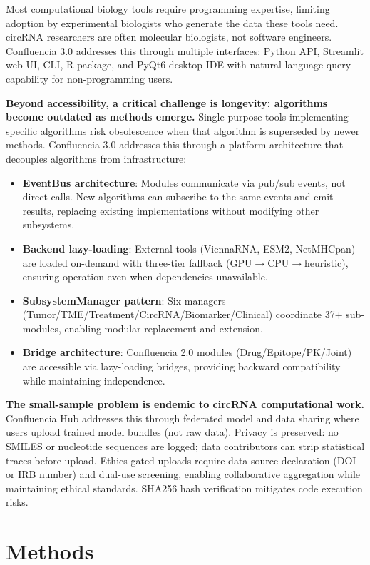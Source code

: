 \documentclass[12pt]{article}
\begin{document}
Most computational biology tools require programming expertise, limiting adoption by experimental biologists who generate the data these tools need. circRNA researchers are often molecular biologists, not software engineers. Confluencia 3.0 addresses this through multiple interfaces: Python API, Streamlit web UI, CLI, R package, and PyQt6 desktop IDE with natural-language query capability for non-programming users.

\textbf{Beyond accessibility, a critical challenge is longevity: algorithms become outdated as methods emerge.} Single-purpose tools implementing specific algorithms risk obsolescence when that algorithm is superseded by newer methods. Confluencia 3.0 addresses this through a platform architecture that decouples algorithms from infrastructure:

\begin{itemize}
\item \textbf{EventBus architecture}: Modules communicate via pub/sub events, not direct calls. New algorithms can subscribe to the same events and emit results, replacing existing implementations without modifying other subsystems.
\item \textbf{Backend lazy-loading}: External tools (ViennaRNA, ESM2, NetMHCpan) are loaded on-demand with three-tier fallback (GPU$\rightarrow$CPU$\rightarrow$heuristic), ensuring operation even when dependencies unavailable.
\item \textbf{SubsystemManager pattern}: Six managers (Tumor/TME/Treatment/CircRNA/Biomarker/Clinical) coordinate 37+ sub-modules, enabling modular replacement and extension.
\item \textbf{Bridge architecture}: Confluencia 2.0 modules (Drug/Epitope/PK/Joint) are accessible via lazy-loading bridges, providing backward compatibility while maintaining independence.
\end{itemize}

\textbf{The small-sample problem is endemic to circRNA computational work.} Confluencia Hub addresses this through federated model and data sharing where users upload trained model bundles (not raw data). Privacy is preserved: no SMILES or nucleotide sequences are logged; data contributors can strip statistical traces before upload. Ethics-gated uploads require data source declaration (DOI or IRB number) and dual-use screening, enabling collaborative aggregation while maintaining ethical standards. SHA256 hash verification mitigates code execution risks.

\section{Methods}
\end{document}
